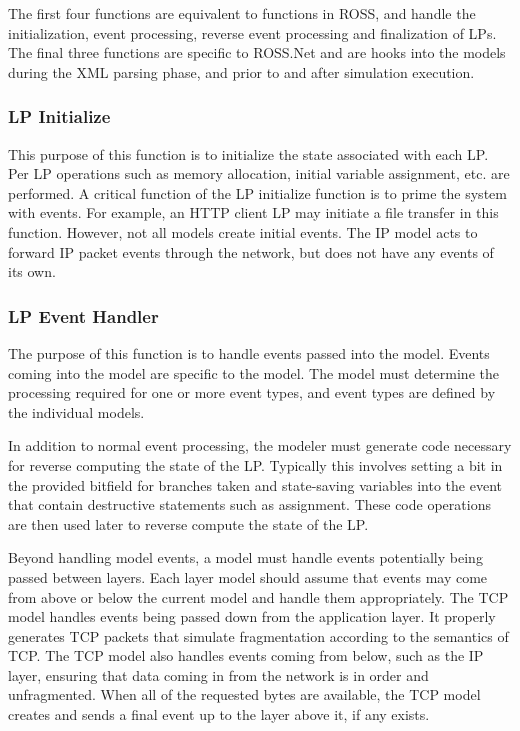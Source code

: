 \documentclass[conference,onecolumn]{IEEEtran}
\begin{document}
The first four functions are equivalent to functions in ROSS, and handle the initialization, event processing, reverse event processing and finalization of LPs.  The final three functions are specific to ROSS.Net and are hooks into the models during the XML parsing phase, and prior to and after simulation execution.

\subsubsection{LP Initialize}

This purpose of this function is to initialize the state associated with each LP.  Per LP operations such as memory allocation, initial variable assignment, etc. are performed.  A critical function of the LP initialize function is to prime the system with events.  For example, an HTTP client LP may initiate a file transfer in this function.  However, not all models create initial events. The IP model acts to forward IP packet events through the network, but does not have any events of its own.

\subsubsection{LP Event Handler}

The purpose of this function is to handle events passed into the model.  Events coming into the model are specific to the model.  The model must determine the processing required for one or more event types, and event types are defined by the individual models.

In addition to normal event processing, the modeler must generate code necessary for reverse computing the state of the LP.  Typically this involves setting a bit in the provided bitfield for branches taken and state-saving variables into the event that contain destructive statements such as assignment.  These code operations are then used later to reverse compute the state of the LP.

Beyond handling model events, a model must handle events potentially being passed between layers.  Each layer model should assume that events may come from above or below the current model and handle them appropriately.  The TCP model handles events being passed down from the application layer.  It properly generates TCP packets that simulate fragmentation according to the semantics of TCP.  The TCP model also handles events coming from below, such as the IP layer, ensuring that data coming in from the network is in order and unfragmented.  When all of the requested bytes are available, the TCP model creates and sends a final event up to the layer above it, if any exists.
\end{document}

